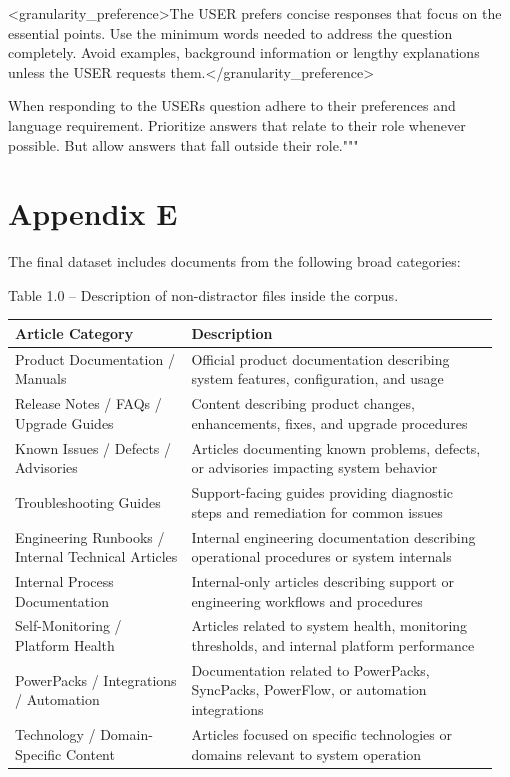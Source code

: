 \documentclass[11pt]{article}
\begin{document}
\textless granularity\_preference\textgreater The USER prefers concise
responses that focus on the essential points. Use the minimum words
needed to address the question completely. Avoid examples, background
information or lengthy explanations unless the USER requests
them.\textless/granularity\_preference\textgreater{}

When responding to the USER\textquotesingle s question adhere to their
preferences and language requirement. Prioritize answers that relate to
their role whenever possible. But allow answers that fall outside their
role."""

\section{Appendix E}

The final dataset includes documents from the following broad categories:

Table 1.0 -- Description of non-distractor files inside the corpus.

\begin{longtable}[]{@{}
  >{\raggedright\arraybackslash}p{0.35\linewidth}
  >{\raggedright\arraybackslash}p{0.61\linewidth}@{}}
\toprule
Article Category & Description \\
\midrule
\endhead
\bottomrule
\endlastfoot
Product Documentation / Manuals & Official product documentation
describing system features, configuration, and usage \\
Release Notes / FAQs / Upgrade Guides & Content describing product
changes, enhancements, fixes, and upgrade procedures \\
Known Issues / Defects / Advisories & Articles documenting known
problems, defects, or advisories impacting system behavior \\
Troubleshooting Guides & Support-facing guides providing diagnostic
steps and remediation for common issues \\
Engineering Runbooks / Internal Technical Articles & Internal
engineering documentation describing operational procedures or system
internals \\
Internal Process Documentation & Internal-only articles describing
support or engineering workflows and procedures \\
Self-Monitoring / Platform Health & Articles related to system health,
monitoring thresholds, and internal platform performance \\
PowerPacks / Integrations / Automation & Documentation related to
PowerPacks, SyncPacks, PowerFlow, or automation integrations \\
Technology / Domain-Specific Content & Articles focused on specific
technologies or domains relevant to system operation \\
\end{longtable}
\end{document}
